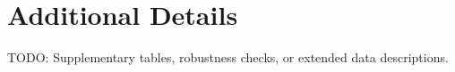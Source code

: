 \section{Additional Details}
\label{sec:appendix}

TODO: Supplementary tables, robustness checks, or extended data descriptions.
